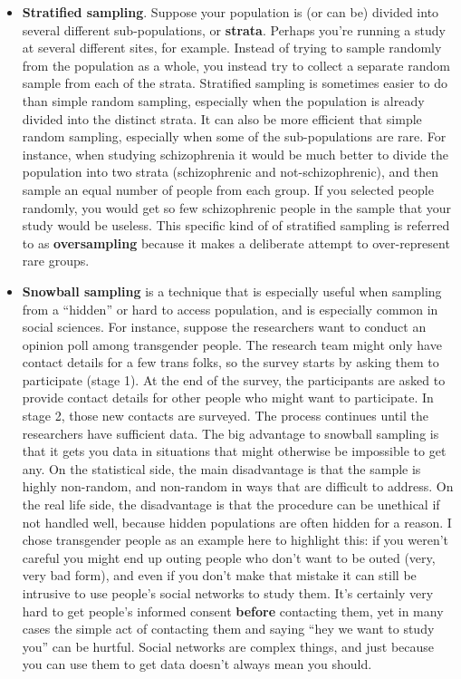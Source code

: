 \documentclass[
]{book}
\begin{document}
\begin{itemize}
\item
  \textbf{Stratified sampling}. Suppose your population is (or can be) divided into several different sub-populations, or \textbf{strata}. Perhaps you're running a study at several different sites, for example. Instead of trying to sample randomly from the population as a whole, you instead try to collect a separate random sample from each of the strata. Stratified sampling is sometimes easier to do than simple random sampling, especially when the population is already divided into the distinct strata. It can also be more efficient that simple random sampling, especially when some of the sub-populations are rare. For instance, when studying schizophrenia it would be much better to divide the population into two strata (schizophrenic and not-schizophrenic), and then sample an equal number of people from each group. If you selected people randomly, you would get so few schizophrenic people in the sample that your study would be useless. This specific kind of of stratified sampling is referred to as \textbf{oversampling} because it makes a deliberate attempt to over-represent rare groups.
\item
  \textbf{Snowball sampling} is a technique that is especially useful when sampling from a ``hidden'' or hard to access population, and is especially common in social sciences. For instance, suppose the researchers want to conduct an opinion poll among transgender people. The research team might only have contact details for a few trans folks, so the survey starts by asking them to participate (stage 1). At the end of the survey, the participants are asked to provide contact details for other people who might want to participate. In stage 2, those new contacts are surveyed. The process continues until the researchers have sufficient data. The big advantage to snowball sampling is that it gets you data in situations that might otherwise be impossible to get any. On the statistical side, the main disadvantage is that the sample is highly non-random, and non-random in ways that are difficult to address. On the real life side, the disadvantage is that the procedure can be unethical if not handled well, because hidden populations are often hidden for a reason. I chose transgender people as an example here to highlight this: if you weren't careful you might end up outing people who don't want to be outed (very, very bad form), and even if you don't make that mistake it can still be intrusive to use people's social networks to study them. It's certainly very hard to get people's informed consent \textbf{before} contacting them, yet in many cases the simple act of contacting them and saying ``hey we want to study you'' can be hurtful. Social networks are complex things, and just because you can use them to get data doesn't always mean you should.

\end{itemize}
\end{document}
